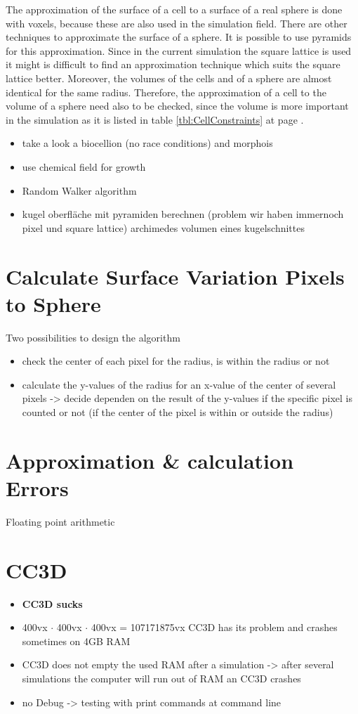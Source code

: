 The approximation of the surface of a cell to a surface of a real sphere is done with voxels, because these are also used in the simulation field. There are other techniques to approximate the surface of a sphere. It is possible to use pyramids for this approximation. Since in the current simulation the square lattice is used it might is difficult to find an approximation technique which suits the square lattice better. Moreover, the volumes of the cells and of a sphere are almost identical for the same radius. Therefore, the approximation of a cell to the volume of a sphere need also to be checked, since the volume is more important in the simulation as it is listed in table \ref{tbl:CellConstraints} at page \pageref{tbl:CellConstraints}.

\begin{itemize}
\item take a look a biocellion (no race conditions) and morphois
\item use chemical field for growth
\item Random Walker algorithm
\item kugel oberfläche mit pyramiden berechnen (problem wir haben immernoch pixel und square lattice)
\subitem archimedes volumen eines kugelschnittes
\end{itemize}

\section{Calculate Surface Variation Pixels to Sphere}
Two possibilities to design the algorithm
\begin{itemize}
\item check the center of each pixel for the radius, is within the radius or not
\item calculate the y-values of the radius for an x-value of the center of several pixels -> decide dependen on the result of the y-values if the specific pixel is counted or not (if the center of the pixel is within or outside the radius)
\end{itemize}

\section{Approximation \& calculation Errors}
Floating point arithmetic

\section{CC3D}
\begin{itemize}
\item \textbf{CC3D sucks}
\item 400vx $\cdot$ 400vx $\cdot$ 400vx = 107171875vx CC3D has its problem and crashes sometimes on 4GB RAM
\item CC3D does not empty the used RAM after a simulation -> after several simulations the computer will run out of RAM an CC3D crashes
\item no Debug -> testing with print commands at command line
\end{itemize}